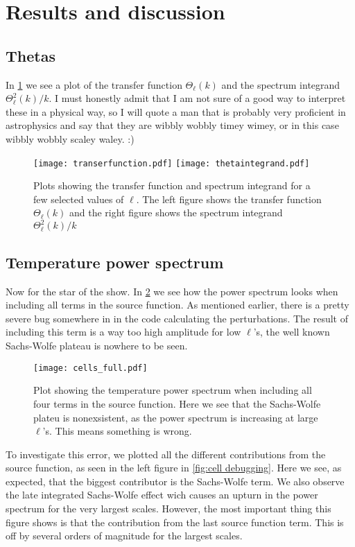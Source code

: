 \documentclass[12pt]{article}
\begin{document}
\section{Results and discussion}
\subsection{Thetas}

In \cref{fig:thetas} we see a plot of the transfer function $\Theta_{\ell}(k)$ and the spectrum integrand $\Theta_{\ell}^2(k)/k$. I must honestly admit that I am not sure of a good way to interpret these in a physical way, so I will quote a man that is probably very proficient in astrophysics and say that they are wibbly wobbly timey wimey, or in this case wibbly wobbly scaley waley. :)

\begin{figure}[h]
    \centering
    \texttt{[image: transerfunction.pdf]}
    \texttt{[image: thetaintegrand.pdf]}  
    \caption{Plots showing the transfer function and spectrum integrand for a few selected values of $\ell$. The left figure shows the transfer function $\Theta_{\ell}(k)$ and the right figure shows the spectrum integrand $\Theta_{\ell}^2(k)/k$ }
    \label{fig:thetas}
\end{figure}


\subsection{Temperature power spectrum}

Now for the star of the show. In \cref{fig:cell full} we see how the power spectrum looks when including all terms in the source function. As mentioned earlier, there is a pretty severe bug somewhere in in the code calculating the perturbations. The result of including this term is a way too high amplitude for low $\ell$'s, the well known Sachs-Wolfe plateau is nowhere to be seen. 

\begin{figure}[h]
    \centering
    \texttt{[image: cells\_full.pdf]} 
    \caption{Plot showing the temperature power spectrum when including all four terms in the source function. Here we see that the Sachs-Wolfe plateu is nonexsistent, as the power spectrum is increasing at large $\ell$'s. This means something is wrong.}
    \label{fig:cell full}
\end{figure}

To investigate this error, we plotted all the different contributions from the source function, as seen in the left figure in \cref{fig:cell debugging}. Here we see, as expected, that the biggest contributor is the Sachs-Wolfe term. We also observe the late integrated Sachs-Wolfe effect wich causes an upturn in the power spectrum for the very largest scales. However, the most important thing this figure shows is that the contribution from the last source function term. This is off by several orders of magnitude for the largest scales. 
\end{document}

